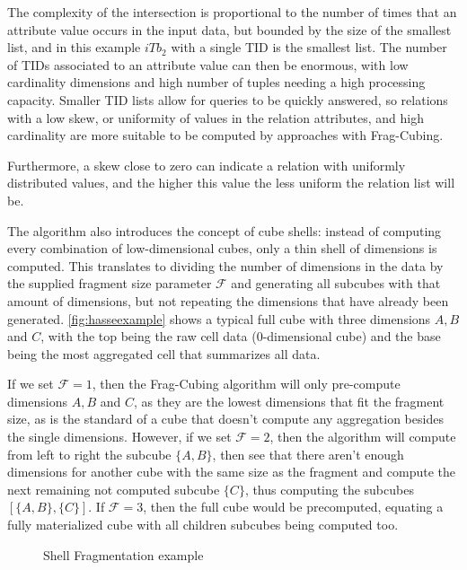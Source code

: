 The complexity of the intersection is proportional to the number of times that an attribute value occurs in the input data, but bounded by the size of the smallest list, and in this example $iTb_2$ with a single TID is the smallest list.
The number of TIDs associated to an attribute value can then be enormous, with low cardinality dimensions and high number of tuples needing a high processing capacity.
Smaller TID lists allow for queries to be quickly answered, so relations with a low skew, or uniformity of values in the relation attributes, and high cardinality are more suitable to be computed by approaches with Frag-Cubing.

Furthermore, a skew close to zero can indicate a relation with uniformly distributed values, and the higher this value the less uniform the relation list will be.

The algorithm also introduces the concept of cube shells: instead of computing every combination of low-dimensional cubes, only a thin shell of dimensions is computed.
This translates to dividing the number of dimensions in the data by the supplied fragment size parameter $\mathcal{F}$ and generating all subcubes with that amount of dimensions, but not repeating the dimensions that have already been generated.
\autoref{fig:hasseexample} shows a typical full cube with three dimensions $A, B$ and $C$, with the top being the raw cell data ($0$-dimensional cube) and the base being the most aggregated cell that summarizes all data.

If we set $\mathcal{F} = 1$, then the Frag-Cubing algorithm will only pre-compute dimensions $A, B$ and $C$, as they are the lowest dimensions that fit the fragment size, as is the standard of a cube that doesn't compute any aggregation besides the single dimensions.
However, if we set $\mathcal{F} = 2$, then the algorithm will compute from left to right the subcube $\{A, B\}$, then see that there aren't enough dimensions for another cube with the same size as the fragment and compute the next remaining not computed subcube $\{C\}$, thus computing the subcubes $[\{A, B\}, \{C\}]$.
If $\mathcal{F} = 3$, then the full cube would be precomputed, equating a fully materialized cube with all children subcubes being computed too.

\begin{figure}[!htb]
  \caption{Shell Fragmentation example}\label{fig:hasseexample}
  \vspace{2mm}
  \begin{center}
  \end{center}
  \vspace{1mm}
  \legenda{}
\end{figure}

